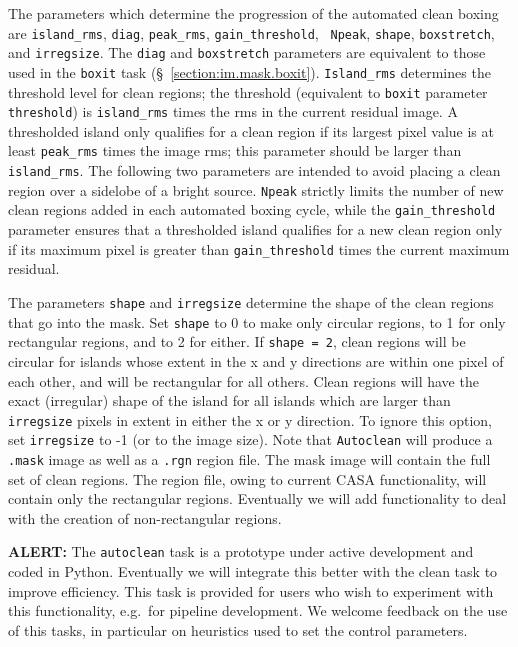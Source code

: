 The parameters which determine the progression of the automated clean boxing
are {\tt island\_rms}, {\tt diag}, {\tt peak\_rms}, {\tt gain\_threshold}, {\tt
Npeak}, {\tt shape}, {\tt boxstretch}, and {\tt irregsize}.  The {\tt diag} and
{\tt boxstretch} parameters are equivalent to those used in the {\tt boxit}
task (\S~\ref{section:im.mask.boxit}).  {\tt Island\_rms} determines the
threshold level for clean regions; the threshold (equivalent to {\tt boxit}
parameter {\tt threshold}) is {\tt island\_rms} times the rms in the current
residual image.  A thresholded island only qualifies for a clean region if its
largest pixel value is at least {\tt peak\_rms} times the image rms; this
parameter should be larger than {\tt island\_rms}.  The following two parameters
are intended to avoid placing a clean region over a sidelobe of a bright
source.  {\tt Npeak} strictly limits the number of new clean regions added in
each automated boxing cycle, while the {\tt gain\_threshold} parameter ensures
that a thresholded island qualifies for a new clean region only if its maximum
pixel is greater than {\tt gain\_threshold} times the current maximum residual.

The parameters {\tt shape} and {\tt irregsize} determine the shape of the clean
regions that go into the mask.  Set {\tt shape} to 0 to make only
circular regions, to 1 for only rectangular regions, and to 2 for
either.  If {\tt shape = 2}, clean regions will be circular for islands whose
extent in the x and y directions are within one pixel of each other, and will
be rectangular for all others.  Clean regions will have the exact (irregular)
shape of the island for all islands which are larger than {\tt irregsize}
pixels in extent in either the x or y direction.  To ignore this option, set
{\tt irregsize} to -1 (or to the image size).  Note that {\tt Autoclean} will
produce a {\tt .mask} image as well as a {\tt .rgn} region file.  The mask
image will contain the full set of clean regions.  The region file, owing to
current CASA functionality, will contain only the rectangular regions.
Eventually we will add functionality to deal with the creation of
non-rectangular regions.

{\bf ALERT:} The {\tt autoclean} task is a prototype under active development and
coded in Python. Eventually we will integrate this better with the
clean task to improve efficiency.  This task is provided for users who
wish to experiment with this functionality, e.g.\ for pipeline
development.  We welcome feedback on the use of this tasks, in
particular on heuristics used to set the control parameters.

